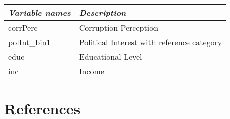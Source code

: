 \documentclass[
  12pt,
  english,
]{article}
\begin{document}
\begin{longtable}[]{@{}ll@{}}
\toprule
\emph{Variable names} & \emph{Description} \\
\midrule
\endhead
corrPerc & Corruption Perception \\
polInt\_bin1 & Political Interest with reference category \\
educ & Educational Level \\
inc & Income \\
\bottomrule
\end{longtable}

\newpage{}

\hypertarget{references}{%
\section*{References}\label{references}}
\end{document}
